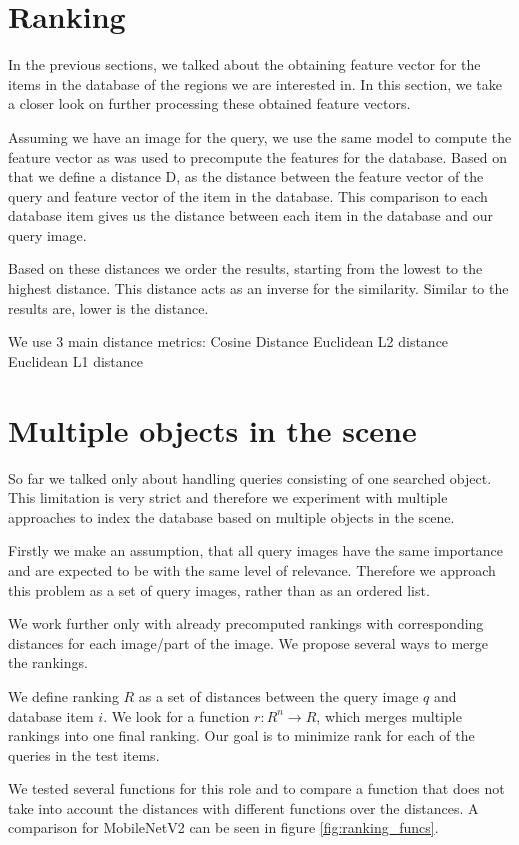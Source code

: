 \section{Ranking}
In the previous sections, we talked about the obtaining feature vector for the items in the database of the regions we are interested in. In this section, we take a closer look on further processing these obtained feature vectors.

Assuming we have an image for the query, we use the same model to compute the feature vector as was used to precompute the features for the database. Based on that we define a distance D, as the distance between the feature vector of the query and feature vector of the item in the database. This comparison to each database item gives us the distance between each item in the database and our query image.

Based on these distances we order the results, starting from the lowest to the highest distance. This distance acts as an inverse for the similarity. Similar to the results are, lower is the distance.

We use 3 main distance metrics:
Cosine Distance
Euclidean L2 distance
Euclidean L1 distance

\section{Multiple objects in the scene}

So far we talked only about handling queries consisting of one searched object. This limitation is very strict and therefore we experiment with multiple approaches to index the database based on multiple objects in the scene.

Firstly we make an assumption, that all query images have the same importance and are expected to be with the same level of relevance. Therefore we approach this problem as a set of query images, rather than as an ordered list.

We work further only with already precomputed rankings with corresponding distances for each image/part of the image. We propose several ways to merge the rankings.

We define ranking $R$ as a set of distances between the query image $q$ and database item $i$. We look for a function $r: R^n \rightarrow R$, which merges multiple rankings into one final ranking. Our goal is to minimize rank for each of the queries in the test items.

We tested several functions for this role and to compare a function that does not take into account the distances with different functions over the distances. A comparison for MobileNetV2 can be seen in figure \ref{fig:ranking_funcs}.

